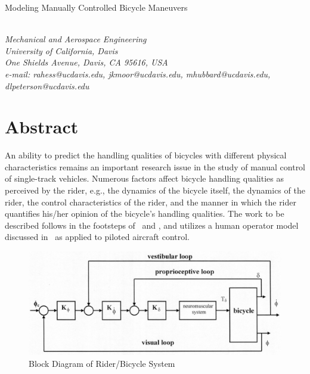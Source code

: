\documentclass{bmd2010a}
\begin{document}
\begin{flushleft}
{\fontsize{16pt}{20pt}\selectfont%
  Modeling Manually Controlled Bicycle Maneuvers\\}
\end{flushleft}

\begin{flushleft}
  {\\}
  \textit{Mechanical and Aerospace Engineering\\
          University of California, Davis\\
          One Shields Avenue, Davis, CA 95616, USA\\
          e-mail: rahess@ucdavis.edu, jkmoor@ucdavis.edu, mhubbard@ucdavis.edu,
          dlpeterson@ucdavis.edu
  }\vspace{10pt}\\
\end{flushleft}

\section*{Abstract}
An ability to predict the handling qualities of bicycles with different
physical characteristics remains an important research issue in the study of
manual control of single-track vehicles. Numerous factors affect bicycle
handling qualities as perceived by the rider, e.g., the dynamics of the bicycle
itself, the dynamics of the rider, the control characteristics of the rider,
and the manner in which the rider quantifies his/her opinion of the bicycle's
handling qualities. The work to be described follows in the footsteps
of~\cite{Lunteren1970} and \cite{Weir1972}, and utilizes a human operator model
discussed in~\cite{Hess2006} as applied to
piloted aircraft control.
\begin{figure}[hb]
    \centering
    \includegraphics[width=0.7\columnwidth]{block.jpg}
    \caption{Block Diagram of Rider/Bicycle System}
    \label{fig:block}
\end{figure}
\end{document}
